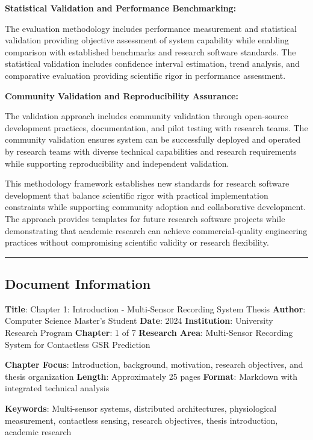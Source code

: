 \documentclass[11pt,a4paper]{article}
\begin{document}
\textbf{Statistical Validation and Performance Benchmarking:}

The evaluation methodology includes performance measurement and statistical
validation providing objective
assessment of system capability while enabling comparison with established benchmarks
and research software standards.
The statistical validation includes confidence interval estimation, trend analysis,
and comparative evaluation providing
scientific rigor in performance assessment.

\textbf{Community Validation and Reproducibility Assurance:}

The validation approach includes community validation through open-source development
practices,
documentation, and pilot testing with research teams.  The community validation
ensures system can be successfully
deployed and operated by research teams with diverse technical capabilities and
research requirements while supporting
reproducibility and independent validation.

This methodology framework establishes new standards for research software
development that balance
scientific rigor with practical implementation constraints while supporting community
adoption and collaborative
development.  The approach provides templates for future research software projects
while demonstrating that academic
research can achieve commercial-quality engineering practices without compromising
scientific validity or research
flexibility.

\hrule

\subsection{Document Information}

\textbf{Title}: Chapter 1: Introduction - Multi-Sensor Recording System Thesis
\textbf{Author}: Computer Science Master's Student
\textbf{Date}: 2024
\textbf{Institution}: University Research Program
\textbf{Chapter}: 1 of 7
\textbf{Research Area}: Multi-Sensor Recording System for Contactless GSR Prediction

\textbf{Chapter Focus}: Introduction, background, motivation, research objectives, and thesis organization
\textbf{Length}: Approximately 25 pages
\textbf{Format}: Markdown with integrated technical analysis

\textbf{Keywords}: Multi-sensor systems, distributed architectures, physiological measurement, contactless sensing, research
objectives, thesis introduction, academic research
\end{document}
